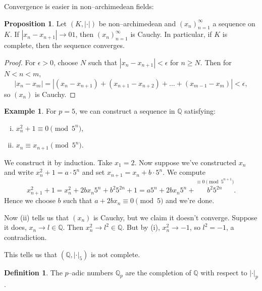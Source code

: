 \documentclass{article}
\theoremstyle{definition}
\newtheorem{prop}[theorem]{Proposition}
\newtheorem{example}{Example}[section]
\newtheorem{defn}{Definition}[section]
\begin{document}
Convergence is easier in non--archimedean fields:
\begin{prop}
    Let $(K,|\cdot|)$ be non--archimedean and $(x_n)_{n=1}^{\infty}$ a sequence on $K$. If $|x_n-x_{n+1}| \to01$, then $(x_n)_{n=1}^{\infty}$ is Cauchy. In particular, if $K$ is complete, then the sequence converges.
\end{prop}
\begin{proof}
    For $\epsilon > 0 $, choose $N$ such that $|x_n-x_{n+1}| < \epsilon$ for $n \ge N$. Then for $N<n<m$, \[
    |x_n - x_m| = |(x_n - x_{n+1}) + (x_{n+1} - x_{n+2}) + \ldots + (x_{m-1}-x_m)| < \epsilon,
    \]
    so $(x_n)$ is Cauchy.
\end{proof}
\begin{example}
    For $p=5$, we can construct a sequence in $\mathbb{Q}$ satisfying:
    \begin{enumerate}[(i)]
        \item $x_n^2+1 \equiv  0 \pmod{5^n}$,
        \item $x_n \equiv x_{n+1} \pmod{5^n}$.
    \end{enumerate}
    We construct it by induction. Take $x_1=2$. Now suppose we've constructed $x_n$ and write $x_n^2+1 = a\cdot 5^n$ and set $x_{n+1} = x_n + b\cdot 5^n$. We compute \[
    x_{n+1}^2 + 1 = x_n^2 + 2b x_n 5^n + b^2 5^{2n} + 1 = a5^n + 2bx_n 5^n + \stackrel{\equiv 0 \pmod{5^{n+1}}}{b^2 5^{2n}}. 
    \]
    Hence we choose $b$ such that $a+2bx_n \equiv 0 \pmod{5}$ and we're done. 
    \vspace{1mm}
     
    Now (ii) tells us that $(x_n)$ is Cauchy, but we claim it doesn't converge. Suppose it does, $x_n \to l \in \mathbb{Q}$. Then $x_n^2 \to l^2 \in \mathbb{Q}$. But by (i), $x_n^2 \to -1$, so $l^2 = -1$, a contradiction.
\end{example}
This tells us that $(\mathbb{Q}, |\cdot|_{5})$ is not complete.
\begin{defn}
    The $p$--adic numbers $\mathbb{Q}_p$ are the completion of $\mathbb{Q}$ with respect to $|\cdot|_p$.
\end{defn}
\end{document}
